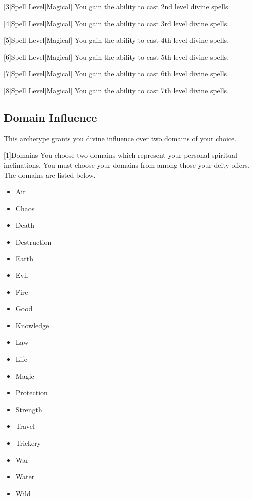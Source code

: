         [3]{Spell Level}[Magical] You gain the ability to cast 2nd level divine spells.

        [4]{Spell Level}[Magical] You gain the ability to cast 3rd level divine spells.

        [5]{Spell Level}[Magical] You gain the ability to cast 4th level divine spells.

        [6]{Spell Level}[Magical] You gain the ability to cast 5th level divine spells.

        [7]{Spell Level}[Magical] You gain the ability to cast 6th level divine spells.

        [8]{Spell Level}[Magical] You gain the ability to cast 7th level divine spells.

    \subsection{Domain Influence}
        This archetype grants you divine influence over two domains of your choice.

        [1]{Domains}
        You choose two domains which represent your personal spiritual inclinations.
        You must choose your domains from among those your deity offers.
        The domains are listed below.

        \begin{itemize}
            \item{Air}
            \item{Chaos}
            \item{Death}
            \item{Destruction}
            \item{Earth}
            \item{Evil}
            \item{Fire}
            \item{Good}
            \item{Knowledge}
            \item{Law}
            \item{Life}
            \item{Magic}
            \item{Protection}
            \item{Strength}
            \item{Travel}
            \item{Trickery}
            \item{War}
            \item{Water}
            \item{Wild}
        \end{itemize}

